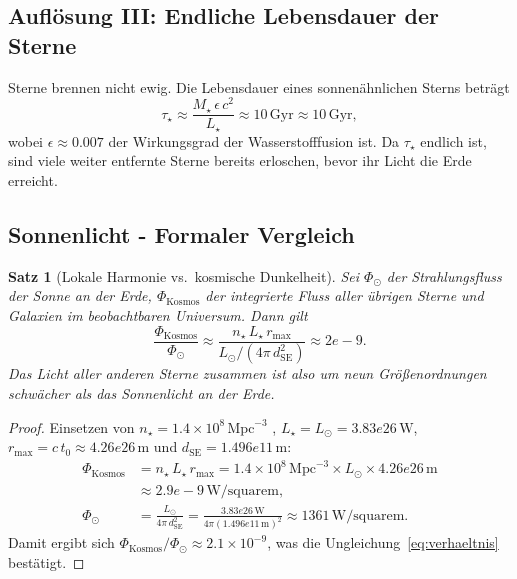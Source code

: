 \documentclass[12pt,a4paper]{article}
\providecommand{\SI}[2]{\ensuremath{#1\,#2}}
\providecommand{\num}[1]{#1}
\providecommand{\giga}{\mathrm{G}}
\providecommand{\per}{/}
\providecommand{\square}{\mathrm{square}}
\providecommand{\watt}{\mathrm{W}}
\providecommand{\metre}{\mathrm{m}}
\providecommand{\year}{\mathrm{yr}}
\renewcommand{\year}{\mathrm{yr}}
\newtheorem{theorem}{Satz}
\begin{document}
\subsection{Auflösung III: Endliche Lebensdauer der Sterne}

Sterne brennen nicht ewig. Die Lebensdauer eines sonnenähnlichen
Sterns beträgt
\begin{equation}
  \tau_\star \approx \frac{M_\star\,\epsilon\,c^2}{L_\star}
             \approx \SI{10}{\giga\year} \approx 10\,\mathrm{Gyr},
  \label{eq:stern_lebensdauer}
\end{equation}
wobei $\epsilon \approx 0.007$ der Wirkungsgrad der
Wasserstofffusion ist.
Da $\tau_\star$ endlich ist, sind viele weiter entfernte
Sterne bereits erloschen, bevor ihr Licht die Erde erreicht.

\subsection{Sonnenlicht - Formaler Vergleich}

\begin{theorem}[Lokale Harmonie vs.\ kosmische Dunkelheit]
  Sei $\Phi_\odot$ der Strahlungsfluss der Sonne an der Erde,
  $\Phi_{\mathrm{Kosmos}}$ der integrierte Fluss aller
  übrigen Sterne und Galaxien im beobachtbaren Universum.
  Dann gilt
  \begin{equation}
    \frac{\Phi_{\mathrm{Kosmos}}}{\Phi_\odot}
    \approx \frac{n_\star\,L_\star\,r_{\max}}{L_\odot / (4\pi\,d_{\mathrm{SE}}^2)}
    \approx \num{2e-9}.
    \label{eq:verhaeltnis}
  \end{equation}
  Das Licht aller anderen Sterne zusammen ist also um neun
  Größenordnungen schwächer als das Sonnenlicht an der Erde.
\end{theorem}

\begin{proof}
  Einsetzen von $n_\star = 1.4 \times 10^{8}\,\mathrm{Mpc}^{-3}$
  \citep{Conselice2016},
  $L_\star = L_\odot = \SI{3.83e26}{\watt}$,
  $r_{\max} = c\,t_0 \approx \SI{4.26e26}{\metre}$ und
  $d_{\mathrm{SE}} = \SI{1.496e11}{\metre}$:
  \begin{align*}
    \Phi_{\mathrm{Kosmos}} &= n_\star\,L_\star\,r_{\max}
      = 1.4\times 10^{8}\,\mathrm{Mpc}^{-3}\times L_\odot
        \times \SI{4.26e26}{\metre}\\
      &\approx \SI{2.9e-9}{\watt\per\square\metre},\\
    \Phi_\odot &= \frac{L_\odot}{4\pi\,d_{\mathrm{SE}}^2}
      = \frac{\SI{3.83e26}{\watt}}{4\pi (\SI{1.496e11}{\metre})^2}
      \approx \SI{1361}{\watt\per\square\metre}.
  \end{align*}
  Damit ergibt sich
  $\Phi_{\mathrm{Kosmos}}/\Phi_\odot \approx 2.1\times 10^{-9}$,
  was die Ungleichung~\eqref{eq:verhaeltnis} bestätigt.
\end{proof}
\end{document}
